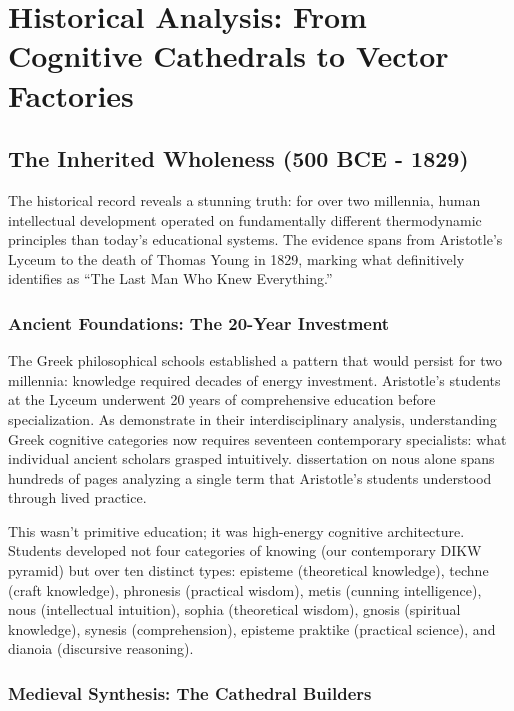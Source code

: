\section{Historical Analysis: From Cognitive Cathedrals to Vector Factories}

\subsection{The Inherited Wholeness (500 BCE - 1829)}

The historical record reveals a stunning truth: for over two millennia, human intellectual development operated on fundamentally different thermodynamic principles than today's educational systems. The evidence spans from Aristotle's Lyceum to the death of Thomas Young in 1829, marking what \citet{robinson2006} definitively identifies as ``The Last Man Who Knew Everything.''

\subsubsection{Ancient Foundations: The 20-Year Investment}

The Greek philosophical schools established a pattern that would persist for two millennia: knowledge required decades of energy investment. Aristotle's students at the Lyceum underwent 20 years of comprehensive education before specialization. As \citet{mouzala2024} demonstrate in their interdisciplinary analysis, understanding Greek cognitive categories now requires seventeen contemporary specialists: what individual ancient scholars grasped intuitively. \citet{erkizan1997} dissertation on nous alone spans hundreds of pages analyzing a single term that Aristotle's students understood through lived practice.

This wasn't primitive education; it was high-energy cognitive architecture. Students developed not four categories of knowing (our contemporary DIKW pyramid) but over ten distinct types: episteme (theoretical knowledge), techne (craft knowledge), phronesis (practical wisdom), metis (cunning intelligence), nous (intellectual intuition), sophia (theoretical wisdom), gnosis (spiritual knowledge), synesis (comprehension), episteme praktike (practical science), and dianoia (discursive reasoning).

\subsubsection{Medieval Synthesis: The Cathedral Builders}

